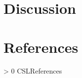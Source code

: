 \documentclass[
  english,
  man,floatsintext]{apa6}
\newlength{\cslhangindent}
\newenvironment{CSLReferences}[3] %
 {%
  \setlength{\parindent}{0pt}
  \ifodd #1 \everypar{\setlength{\hangindent}{\cslhangindent}}\ignorespaces\fi
  \ifnum #2 > 0
  \setlength{\parskip}{#2\baselineskip}
  \fi
 }%
 {}
\begin{document}
\hypertarget{discussion}{%
\section{Discussion}\label{discussion}}

\newpage

\hypertarget{references}{%
\section{References}\label{references}}

\begingroup
\setlength{\parindent}{-0.5in}
\setlength{\leftskip}{0.5in}

\hypertarget{refs}{}
\begin{CSLReferences}{0}{0}
\end{CSLReferences}

\endgroup


\printbibliography
\end{document}
